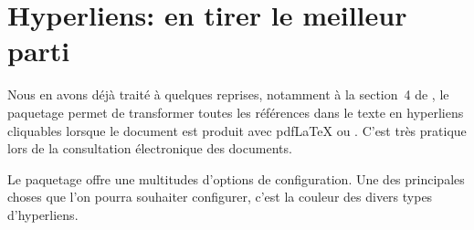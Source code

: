 \section{Hyperliens: en tirer le meilleur parti}
\label{sec:trucs:hyperliens}

Nous en avons déjà traité à quelques reprises, notamment à la
section~4 de \citet{UL:latex:1}, le paquetage  permet de
transformer toutes les références dans le texte en hyperliens
cliquables lorsque le document est produit avec pdf{\LaTeX} ou
{\XeLaTeX}. C'est très pratique lors de la consultation électronique
des documents.

Le paquetage offre une multitudes d'options de configuration. Une des
principales choses que l'on pourra souhaiter configurer, c'est la
couleur des divers types d'hyperliens.










